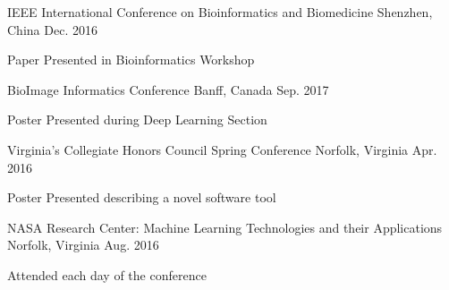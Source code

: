 \begin{cventries}
  \cventrya
    {}
    {IEEE International Conference on Bioinformatics and Biomedicine}
    {Shenzhen, China}
    {Dec. 2016}
    {
        \begin{cvitems}
            \item {Paper Presented in Bioinformatics Workshop}
          \end{cvitems}
    }
\end{cventries}
\vspace{-3mm}
\begin{cventries}
  \cventrya
    {}
    {BioImage Informatics Conference}
    {Banff, Canada}
    {Sep. 2017}
    {
        \begin{cvitems}
            \item {Poster Presented during Deep Learning Section}
          \end{cvitems}
    }
\end{cventries}
\vspace{-3mm}
\begin{cventries}
  \cventrya
    {}
    {Virginia's Collegiate Honors Council Spring Conference}
    {Norfolk, Virginia}
    {Apr. 2016}
    {
        \begin{cvitems}
            \item {Poster Presented describing a novel software tool}
          \end{cvitems}
    }
\end{cventries}
\vspace{-3mm}
\begin{cventries}
  \cventrya
    {}
    {NASA Research Center: Machine Learning Technologies and their Applications}
    {Norfolk, Virginia}
    {Aug. 2016}
    {
        \begin{cvitems}
            \item {Attended each day of the conference}
          \end{cvitems}
    }
\end{cventries}